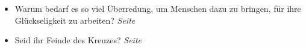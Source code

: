\begin{itemize}
\begin{itemize}
 \end{itemize}

 \item Warum bedarf es so viel Überredung, um Menschen dazu zu bringen, für ihre
Glückseligkeit zu arbeiten?
 \dotfill \textit{Seite~\pageref{ref:18_11_ueberredung}}\\

 \item Seid ihr Feinde des Kreuzes?
 \dotfill \textit{Seite~\pageref{ref:18_11_feinde_des_kreuzes}}\\
\end{itemize}



